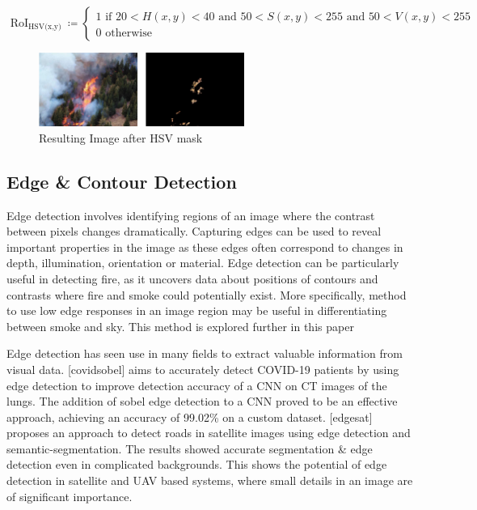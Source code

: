 \[\text{ RoI}_{\text{HSV(x,y) }} ≔ \begin{cases}
1\text{ if }20 < H(x,y) < 40\text{ and }50 < S(x,y) < 255\text{ and }50 < V(x,y) < 255 \\
0\text{ otherwise}
\end{cases}\]

\begin{figure}
\centering
\includegraphics[width=0.6\textwidth,height=\textheight]{hsv_filter.jpg}
\caption{Resulting Image after HSV mask}
\end{figure}

\label{sn}{}

\subsection{Edge \& Contour Detection}

Edge detection involves identifying regions of an image where the
contrast between pixels changes dramatically. Capturing edges can be
used to reveal important properties in the image as these edges often
correspond to changes in depth, illumination, orientation or material.
Edge detection can be particularly useful in detecting fire, as it
uncovers data about positions of contours and contrasts where fire and
smoke could potentially exist. More specifically, method to use low edge
responses in an image region may be useful in differentiating between
smoke and sky. This method is explored further in this paper

Edge detection has seen use in many fields to extract valuable
information from visual data. {[}covidsobel{]} aims to accurately detect
COVID-19 patients by using edge detection to improve detection accuracy
of a CNN on CT images of the lungs. The addition of sobel edge detection
to a CNN proved to be an effective approach, achieving an accuracy of
99.02\% on a custom dataset. {[}edgesat{]} proposes an approach to
detect roads in satellite images using edge detection and
semantic-segmentation. The results showed accurate segmentation \& edge
detection even in complicated backgrounds. This shows the potential of
edge detection in satellite and UAV based systems, where small details
in an image are of significant importance.


